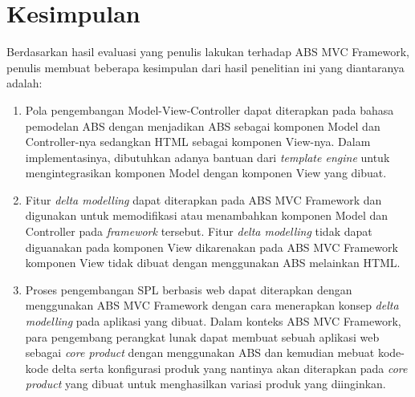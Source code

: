 \chapter{Kesimpulan}

Berdasarkan hasil evaluasi yang penulis lakukan terhadap ABS MVC Framework, penulis membuat beberapa kesimpulan dari hasil penelitian ini yang diantaranya adalah:

\begin{enumerate}
    \item Pola pengembangan Model-View-Controller dapat diterapkan pada bahasa pemodelan ABS dengan menjadikan ABS sebagai komponen Model dan Controller-nya sedangkan HTML sebagai komponen View-nya. Dalam implementasinya, dibutuhkan adanya bantuan dari \textit{template engine} untuk mengintegrasikan komponen Model dengan komponen View yang dibuat.
    \item Fitur \textit{delta modelling} dapat diterapkan pada ABS MVC Framework dan digunakan untuk memodifikasi atau menambahkan komponen Model dan Controller pada \textit{framework} tersebut. Fitur \textit{delta modelling} tidak dapat diguanakan pada komponen View dikarenakan pada ABS MVC Framework komponen View tidak dibuat dengan menggunakan ABS melainkan HTML.
    \item Proses pengembangan SPL berbasis web dapat diterapkan dengan menggunakan ABS MVC Framework dengan cara menerapkan konsep \textit{delta modelling} pada aplikasi yang dibuat. Dalam konteks ABS MVC Framework, para pengembang perangkat lunak dapat membuat sebuah aplikasi web sebagai \textit{core product} dengan menggunakan ABS dan kemudian mebuat kode-kode delta serta konfigurasi produk yang nantinya akan diterapkan pada \textit{core product} yang dibuat untuk menghasilkan variasi produk yang diinginkan.
\end{enumerate}